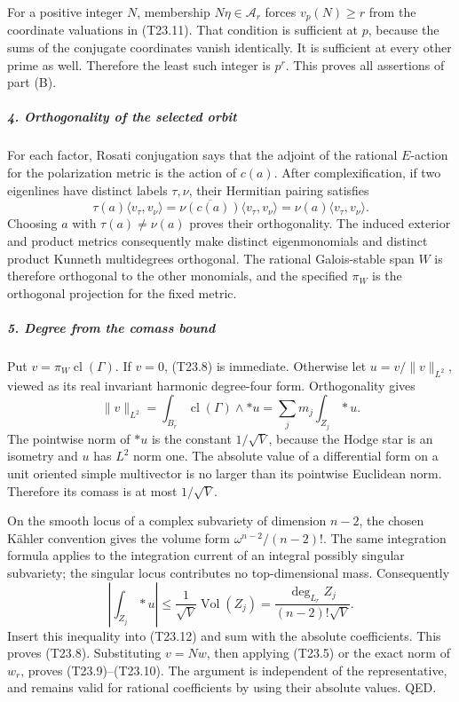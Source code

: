 \documentclass[11pt,a4paper]{article}
\theoremstyle{definition}
\begin{document}
For a positive integer \(N\), membership \(N\eta\in\mathcal A_r\) forces \(v_p(N)\ge r\) from the coordinate valuations in (T23.11). That condition is sufficient at \(p\), because the sums of the conjugate coordinates vanish identically. It is sufficient at every other prime as well. Therefore the least such integer is \(p^r\). This proves all assertions of part (B).

\subparagraph{4. Orthogonality of the selected orbit}\label{orthogonality-of-the-selected-orbit}

For each factor, Rosati conjugation says that the adjoint of the rational \(E\)-action for the polarization metric is the action of \(c(a)\). After complexification, if two eigenlines have distinct labels \(\tau,\nu\), their Hermitian pairing satisfies \[
 \tau(a)\langle v_\tau,v_\nu\rangle
  =\overline{\nu(c(a))}\langle v_\tau,v_\nu\rangle
  =\nu(a)\langle v_\tau,v_\nu\rangle .
\] Choosing \(a\) with \(\tau(a)\ne\nu(a)\) proves their orthogonality. The induced exterior and product metrics consequently make distinct eigenmonomials and distinct product Kunneth multidegrees orthogonal. The rational Galois-stable span \(W\) is therefore orthogonal to the other monomials, and the specified \(\pi_W\) is the orthogonal projection for the fixed metric.

\subparagraph{5. Degree from the comass bound}\label{degree-from-the-comass-bound}

Put \(v=\pi_W\operatorname{cl}(\Gamma)\). If \(v=0\), (T23.8) is immediate. Otherwise let \(u=v/\|v\|_{L^2}\), viewed as its real invariant harmonic degree-four form. Orthogonality gives \[
 \|v\|_{L^2}
  =\int_{B_r}\operatorname{cl}(\Gamma)\wedge *u
  =\sum_j m_j\int_{Z_j}*u.
 \tag{T23.12}
\] The pointwise norm of \(*u\) is the constant \(1/\sqrt V\), because the Hodge star is an isometry and \(u\) has \(L^2\) norm one. The absolute value of a differential form on a unit oriented simple multivector is no larger than its pointwise Euclidean norm. Therefore its comass is at most \(1/\sqrt V\).

On the smooth locus of a complex subvariety of dimension \(n-2\), the chosen Kähler convention gives the volume form \(\omega^{n-2}/(n-2)!\). The same integration formula applies to the integration current of an integral possibly singular subvariety; the singular locus contributes no top-dimensional mass. Consequently \[
 \left|\int_{Z_j}*u\right|
 \le \frac{1}{\sqrt V}\operatorname{Vol}(Z_j)
 =\frac{\deg_{L_r}Z_j}{(n-2)!\sqrt V}.
\] Insert this inequality into (T23.12) and sum with the absolute coefficients. This proves (T23.8). Substituting \(v=Nw\), then applying (T23.5) or the exact norm of \(w_r\), proves (T23.9)--(T23.10). The argument is independent of the representative, and remains valid for rational coefficients by using their absolute values. QED.
\end{document}
